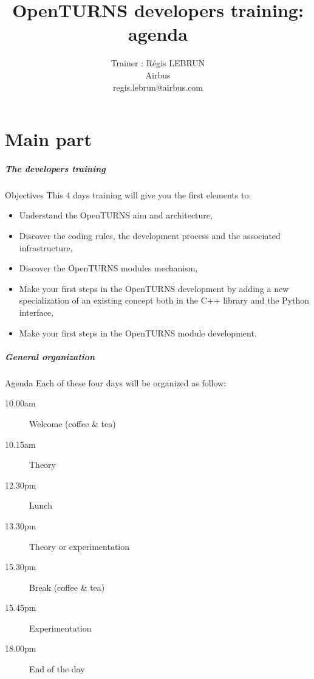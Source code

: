 \documentclass{beamer}
\title[Openturns developers training: agenda]{OpenTURNS developers training: agenda}
\author[OpenTURNS Consortium, 2019]
{
  Trainer : R\'egis LEBRUN\\ 
  Airbus \\
  regis.lebrun@airbus.com
}
\date[March 22-25th 2011]
{
  Developers training \\

  \begin{center}
    \texttt{[image: logoOT.jpg]}
  \end{center}
}
\begin{document}
\frame{\titlepage}

\part{Main part}

\begin{frame}
  \frametitle{The developers training}
  \begin{block}{Objectives}
    This 4 days training will give you the first elements to:
    \begin{itemize}
    \item Understand the OpenTURNS aim and architecture,
    \item Discover the coding rules, the development process and the associated infrastructure,
    \item Discover the OpenTURNS modules mechanism,
    \item Make your first steps in the OpenTURNS development by adding a new specialization of an existing concept both in the C++ library and the Python interface,
    \item Make your first steps in the OpenTURNS module development.
    \end{itemize}
  \end{block}
\end{frame}
\begin{frame}
  \frametitle{General organization}
  \begin{block}{Agenda}
    Each of these four days will be organized as follow:
    \begin{description}
    \item[10.00am] Welcome (coffee \& tea)
    \item[10.15am] Theory
    \item[12.30pm] Lunch
    \item[13.30pm] Theory or experimentation
    \item[15.30pm] Break (coffee \& tea)
    \item[15.45pm] Experimentation
    \item[18.00pm] End of the day
    \end{description}
  \end{block}
\end{frame}
\end{document}
